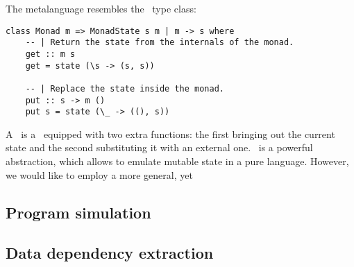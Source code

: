The metalanguage resembles the~ type class:

\begin{verbatim}
class Monad m => MonadState s m | m -> s where
    -- | Return the state from the internals of the monad.
    get :: m s
    get = state (\s -> (s, s))

    -- | Replace the state inside the monad.
    put :: s -> m ()
    put s = state (\_ -> ((), s))
\end{verbatim}

A~ is a~ equipped with two extra functions: the first bringing
out the current state and the second substituting it with an external one.~
is a powerful abstraction, which allows to emulate mutable state in a pure language.
However, we would like to employ a more general, yet 

\subsection{Program simulation}

\subsection{Data dependency extraction}